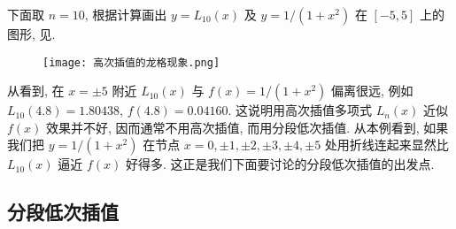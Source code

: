 \documentclass[../../main.tex]{subfiles}
\begin{document}
下面取 $n = 10$, 根据计算画出 $y = L_{10}(x)$ 及 $y = 1/(1 + x^2)$ 在 $[-5, 5]$ 上的图形, 见.
\begin{figure}[H]
\centering
\texttt{[image: 高次插值的龙格现象.png]}
\caption{}
\label{figure:高次插值的龙格现象}
\end{figure}
从看到, 在 $x = \pm 5$ 附近 $L_{10}(x)$ 与 $f(x) = 1/(1 + x^2)$ 偏离很远, 例如 $L_{10}(4.8) = 1.80438$, $f(4.8) = 0.04160$. 这说明用高次插值多项式 $L_n(x)$ 近似 $f(x)$ 效果并不好, 因而通常不用高次插值, 而用分段低次插值. 从本例看到, 如果我们把 $y = 1/(1 + x^2)$ 在节点 $x = 0, \pm 1, \pm 2, \pm 3, \pm 4, \pm 5$ 处用折线连起来显然比 $L_{10}(x)$ 逼近 $f(x)$ 好得多. 这正是我们下面要讨论的分段低次插值的出发点.

\subsection{分段低次插值}
\end{document}

